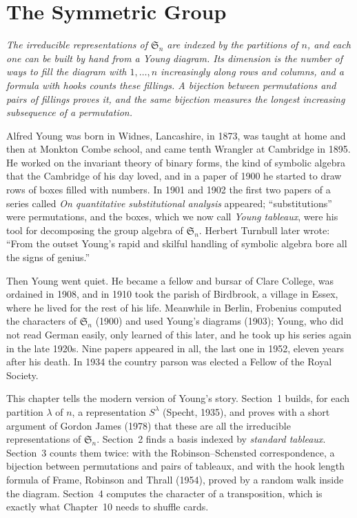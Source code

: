 \chapter{The Symmetric Group}

\begin{center}\itshape
The irreducible representations of $\mathfrak S_n$ are indexed by the partitions of $n$, and each one can be built by hand from a Young diagram. Its dimension is the number of ways to fill the diagram with $1,\dots,n$ increasingly along rows and
columns, and a formula with hooks counts these fillings. A bijection between permutations and pairs of fillings proves it, and the same bijection measures the longest increasing subsequence of a permutation.
\end{center}

Alfred Young was born in Widnes, Lancashire, in 1873, was taught at home and then at Monkton Combe school, and came tenth Wrangler at Cambridge in 1895. He worked on the invariant theory of binary forms, the
kind of symbolic algebra that the Cambridge of his day loved, and in a paper of 1900 he started to draw rows of boxes filled with numbers. In 1901 and 1902 the first two papers of a series called \emph{On quantitative
substitutional analysis} appeared; ``substitutions'' were permutations, and the boxes, which we now call \emph{Young tableaux}, were his tool for decomposing the group algebra of $\mathfrak S_n$.
Herbert Turnbull later wrote: ``From the outset Young's rapid and skilful handling of symbolic algebra bore all the signs of genius.''

Then Young went quiet. He became a fellow and bursar of Clare College, was ordained in 1908, and in 1910 took the parish of Birdbrook, a village in Essex, where he lived for the rest of his life. Meanwhile in Berlin, Frobenius computed the
characters of $\mathfrak S_n$ (1900) and used Young's diagrams (1903); Young, who did not read German easily, only learned of this later, and he took up his series again in the late 1920s. Nine papers appeared in all, the last one in 1952, eleven years after
his death. In 1934 the country parson was elected a Fellow of the Royal Society.

This chapter tells the modern version of Young's story. Section~1 builds, for each partition $\lambda$ of $n$, a representation $S^\lambda$ (Specht, 1935), and proves with a short argument of Gordon James (1978) that these are all the
irreducible representations of $\mathfrak S_n$. Section~2 finds a basis indexed by \emph{standard tableaux}. Section~3 counts them twice: with the Robinson--Schensted correspondence, a bijection between permutations and pairs of tableaux,
and with the hook length formula of Frame, Robinson and Thrall (1954), proved by a random walk inside the diagram. Section~4 computes the character of a transposition, which is exactly what Chapter~10 needs to shuffle cards.

